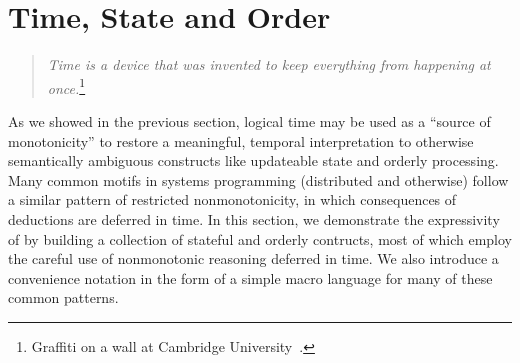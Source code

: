 \section{Time, State and Order}
\label{sec:stateupdate}

\begin{quote}
%
\emph{Time is a device that was invented to keep everything from
happening at once.}\footnote{Graffiti on a wall at Cambridge
University~\cite{scheme}.}
%
\end{quote} 


As we showed in the previous section, logical time may be used as a 
``source of monotonicity'' to restore a meaningful, temporal interpretation to otherwise
semantically ambiguous constructs like updateable state and orderly processing.  
Many common motifs in systems programming
(distributed and otherwise) follow a similar pattern of restricted nonmonotonicity, in 
which consequences of deductions are deferred in time.  In this section, we demonstrate
the expressivity of \lang by building a collection of stateful and orderly contructs,
most of which employ the careful use of nonmonotonic reasoning deferred in time.
We also introduce a convenience notation in the form of a simple macro language
for many of these common patterns.





